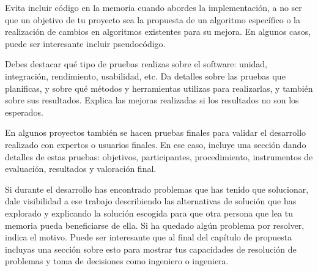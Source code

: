 Evita incluir código en la memoria cuando abordes la implementación, a no ser que un objetivo de tu proyecto sea la propuesta de un algoritmo específico o la realización de cambios en algoritmos existentes para su mejora. En algunos casos, puede ser interesante incluir pseudocódigo.

Debes destacar qué tipo de pruebas realizas sobre el software: unidad, integración, rendimiento, usabilidad, etc. Da detalles sobre las pruebas que planificas, y sobre qué métodos y herramientas utilizas para realizarlas, y también sobre sus resultados. Explica las mejoras realizadas si los resultados no son los esperados. 

En algunos proyectos también se hacen pruebas finales para validar el desarrollo realizado con expertos o usuarios finales. En ese caso, incluye una sección dando detalles de estas pruebas: objetivos, participantes, procedimiento, instrumentos de evaluación, resultados y valoración final.

Si durante el desarrollo has encontrado problemas que has tenido que solucionar, dale visibilidad a ese trabajo describiendo las alternativas de solución que has explorado y explicando la solución escogida para que otra persona que lea tu memoria pueda beneficiarse de ella. Si ha quedado algún problema por resolver, indica el motivo. Puede ser interesante que al final del capítulo de propuesta incluyas una sección sobre esto para mostrar tus capacidades de resolución de problemas y toma de decisiones como ingeniero o ingeniera. 

